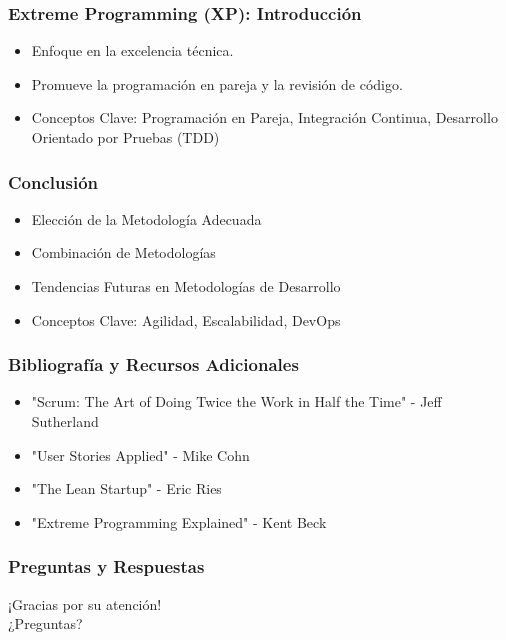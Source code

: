 \documentclass[aspectratio=169]{beamer}
\begin{document}
\begin{frame}
	\frametitle{Extreme Programming (XP): Introducción}
	\begin{itemize}
		\item Enfoque en la excelencia técnica.
		\item Promueve la programación en pareja y la revisión de código.
		\item Conceptos Clave: Programación en Pareja, Integración Continua, Desarrollo Orientado por Pruebas (TDD)
	\end{itemize}
\end{frame}

\begin{frame}
	\frametitle{Conclusión}
	\begin{itemize}
		\item Elección de la Metodología Adecuada
		\item Combinación de Metodologías
		\item Tendencias Futuras en Metodologías de Desarrollo
		\item Conceptos Clave: Agilidad, Escalabilidad, DevOps
	\end{itemize}
\end{frame}

\begin{frame}
	\frametitle{Bibliografía y Recursos Adicionales}
	\begin{itemize}
		\item "Scrum: The Art of Doing Twice the Work in Half the Time" - Jeff Sutherland
		\item "User Stories Applied" - Mike Cohn
		\item "The Lean Startup" - Eric Ries
		\item "Extreme Programming Explained" - Kent Beck
	\end{itemize}
\end{frame}

\begin{frame}
	\frametitle{Preguntas y Respuestas}
	\centering
	\large
	¡Gracias por su atención! \\
	¿Preguntas?
\end{frame}
\end{document}
